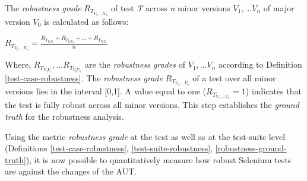 \begin{definition}{The \textit{
robustness grade} ${R_{T_{V_1, ...V_n}}}$ of test \textit{T} across \textit{n} minor versions \textit{$V_1, ...V_n$} of major version \textit{$V_{0}$} is calculated as follows:}
\begin{center}
\vspace{0.5cm}
${R_{T_{V_1, ...V_n}}} = \displaystyle \frac{R_{T_{V_{0}V_{1}}} + R_{T_{V_{0}V_{2}}} + ... + R_{T_{V_{0}V_{n}}}}{n}$ \normalsize

\end{center}
\label{robustness-ground-truth}  
\end{definition} 


Where, \textit{$R_{T_{V_{0}V_{1}}}, ...R_{T_{V_{0}V_{n}}}$} are the 
\textit{robustness grades} of \textit{$V_1, ...V_n$} according to Definition \ref{test-case-robustness}. The \textit{robustness grade} ${R_{T_{V_1, ...V_n}}}$ of a test over all minor versions lies in the interval [0,1]. A value equal to one (${R_{T_{V_1, ...V_n}}}=1$) indicates that the test is fully robust across all minor versions. This step establishes the \textit{ground truth} for the robustness analysis. 

Using the metric \textit{robustness grade} at the test as well as at the test-suite level (Definitions \ref{test-case-robustness}, \ref{test-suite-robustness}, \ref{robustness-ground-truth}), it is now possible to quantitatively measure how robust Selenium tests are against the changes of the AUT. 

